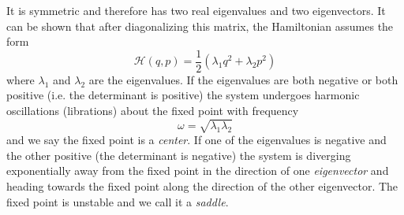 \documentclass[twoside,openright,titlepage,numbers=noenddot,headinclude,%
                footinclude=true,cleardoublepage=empty,abstractoff, 
                BCOR=5mm,paper=a4,fontsize=11pt,%
                american,%
                ]{scrreprt}%
\begin{document}
It is symmetric and therefore has two real 
eigenvalues and two eigenvectors. It can be shown that after 
diagonalizing this matrix, the Hamiltonian assumes the form
\begin{equation}
    \mathcal{H}(q,p)= \frac{1}{2} (\lambda_1 q^2 + \lambda_2 p^2)
\end{equation}
where $\lambda_1$ and $\lambda_2$ are the eigenvalues. If the
eigenvalues are both negative or both positive (i.e. the
determinant is positive) the system undergoes
harmonic oscillations (librations) about the fixed point with 
frequency
\begin{equation}
    \omega = \sqrt{\lambda_1\lambda_2}
\end{equation}
and we say the fixed point is a \emph{center}. If one of the 
eigenvalues is negative and the other positive (the determinant
is negative) the system is
diverging exponentially away from the fixed point in the 
direction of one \emph{eigenvector} and heading towards the 
fixed point along the direction of the other eigenvector. The
fixed point is unstable and we call it a \emph{saddle}.
\end{document}
